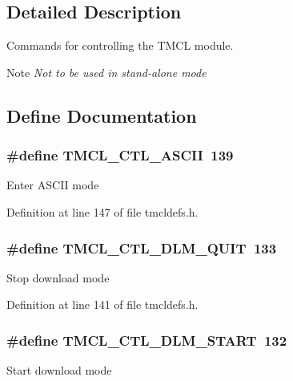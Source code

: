 \subsection{Detailed Description}
Commands for controlling the TMCL module.

\begin{DoxyNote}{Note}
{\itshape Not to be used in stand-\/alone mode\/} 
\end{DoxyNote}


\subsection{Define Documentation}
\hypertarget{group__CTLFuncs_ga36f62eadca8ba64c832ac6120f5a372a}{
\subsubsection[{TMCL\_\-CTL\_\-ASCII}]{\setlength{\rightskip}{0pt plus 5cm}\#define TMCL\_\-CTL\_\-ASCII~139}}
\label{group__CTLFuncs_ga36f62eadca8ba64c832ac6120f5a372a}
Enter ASCII mode 

Definition at line 147 of file tmcldefs.h.\hypertarget{group__CTLFuncs_gaff3c81037366905174f34c8406f058c7}{
\subsubsection[{TMCL\_\-CTL\_\-DLM\_\-QUIT}]{\setlength{\rightskip}{0pt plus 5cm}\#define TMCL\_\-CTL\_\-DLM\_\-QUIT~133}}
\label{group__CTLFuncs_gaff3c81037366905174f34c8406f058c7}
Stop download mode 

Definition at line 141 of file tmcldefs.h.\hypertarget{group__CTLFuncs_gab0ffec97bdd896d0d98eacf2c80ac946}{
\subsubsection[{TMCL\_\-CTL\_\-DLM\_\-START}]{\setlength{\rightskip}{0pt plus 5cm}\#define TMCL\_\-CTL\_\-DLM\_\-START~132}}
\label{group__CTLFuncs_gab0ffec97bdd896d0d98eacf2c80ac946}
Start download mode 

